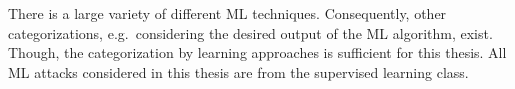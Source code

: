 There is a large variety of different \ac{ML} techniques.
Consequently, other categorizations, e.g.\ considering the desired output of the \ac{ML} algorithm, exist.
Though, the categorization by learning approaches is sufficient for this thesis.
All \ac{ML} attacks considered in this thesis are from the supervised learning class.







